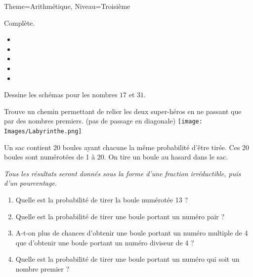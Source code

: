 \documentclass[11pt]{article}
\begin{document}
\begin{multicols}{2}
\begin{Maquette}[Fiche]{Theme=Arithmétique, Niveau=Troisième}
\begin{exercice}
    Complète.
    \begin{itemize}[label={}]
        \item {}
        \item {}
        \item {}
        \item {}
        \item {}
    \end{itemize}
    Dessine les schémas pour les nombres $17$ et $31$.
\end{exercice}

\begin{exercice}
    Trouve un chemin permettant de relier les deux super-héros en ne passant que par des nombres premiers. (pas de passage en diagonale)
    \texttt{[image: Images/Labyrinthe.png]}
\end{exercice}

\columnbreak

\begin{exercice}[Source=DNB 2017]
Un sac contient 20 boules ayant chacune la même probabilité d’être tirée. Ces 20 boules sont numérotées de 1 à 20. On tire un boule au hasard dans le sac.

\emph{Tous les résultats seront donnés sous la forme d’une fraction irréductible, puis d’un pourcentage.}
\begin{enumerate}
    \item Quelle est la probabilité de tirer la boule numérotée 13 ?
    \item Quelle est la probabilité de tirer une boule portant un numéro pair ?
    \item A-t-on plus de chances d’obtenir une boule portant un numéro multiple de 4 que d’obtenir une boule portant un numéro diviseur de 4 ?
    \item Quelle est la probabilité de tirer une boule portant un numéro qui soit un nombre premier ?
\end{enumerate}
\end{exercice}


\end{Maquette}
\end{multicols}
\end{document}
